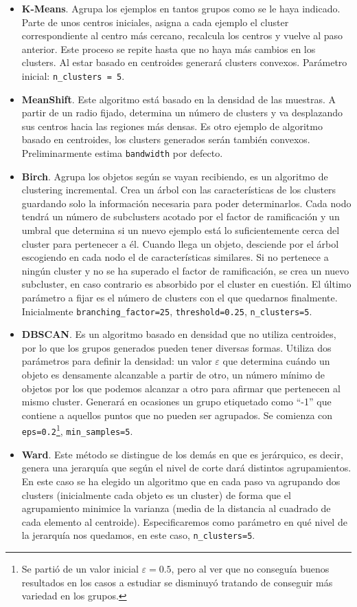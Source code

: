 \documentclass[a4paper, 20pt]{article}
\begin{document}
\begin{itemize}
\item \textbf{K-Means}. Agrupa los ejemplos en tantos grupos como se le haya indicado. Parte de unos centros iniciales, asigna a cada ejemplo el cluster correspondiente al centro más cercano, recalcula los centros y vuelve al paso anterior. Este proceso se repite hasta que no haya más cambios en los clusters. Al estar basado en centroides generará clusters convexos. Parámetro inicial: \texttt{n\_clusters = 5}.
\item \textbf{MeanShift}. Este algoritmo está basado en la densidad de las muestras. A partir de un radio fijado, determina un número de clusters y va desplazando sus centros hacia las regiones más densas. Es otro ejemplo de algoritmo basado en centroides, los clusters generados serán también convexos. Preliminarmente estima \texttt{bandwidth} por defecto.
\item \textbf{Birch}. Agrupa los objetos según se vayan recibiendo, es un algoritmo de clustering incremental. Crea un árbol con las características de los clusters guardando solo la información necesaria para poder determinarlos. Cada nodo tendrá un número de subclusters acotado por el factor de ramificación y un umbral que determina si un nuevo ejemplo está lo suficientemente cerca del cluster para pertenecer a él. Cuando llega un objeto, desciende por el árbol escogiendo en cada nodo el de características similares. Si no pertenece a ningún cluster y no se ha superado el factor de ramificación, se crea un nuevo subcluster, en caso contrario es absorbido por el cluster en cuestión. El último parámetro a fijar es el número de clusters con el que quedarnos finalmente. Inicialmente  \texttt{branching\_factor=25}, \texttt{threshold=0.25}, \texttt{n\_clusters=5}.
\item \textbf{DBSCAN}. Es un algoritmo basado en densidad que no utiliza centroides, por lo que los grupos generados pueden tener diversas formas. Utiliza dos parámetros para definir la densidad: un valor $\varepsilon$ que determina cuándo un objeto es densamente alcanzable a partir de otro, un número mínimo de objetos por los que podemos alcanzar a otro para afirmar que pertenecen al mismo cluster. Generará en ocasiones un grupo etiquetado como ``-1'' que contiene a aquellos puntos que no pueden ser agrupados. Se comienza con \texttt{eps=0.2}\footnote{Se partió de un valor inicial $\varepsilon = 0.5$,  pero al ver que no conseguía buenos resultados en los casos a estudiar se disminuyó tratando de conseguir más variedad en los grupos.}, \texttt{min\_samples=5}.
\item \textbf{Ward}. Este método se distingue de los demás en que es jerárquico, es decir, genera una jerarquía que según el nivel de corte dará distintos agrupamientos. En este caso se ha elegido un algoritmo que en cada paso va agrupando dos clusters (inicialmente cada objeto es un cluster) de forma que el agrupamiento minimice la varianza (media de la distancia al cuadrado de cada elemento al centroide). Especificaremos como parámetro en qué nivel de la jerarquía nos quedamos, en este caso, \texttt{n\_clusters=5}.
\end{itemize}
\end{document}
